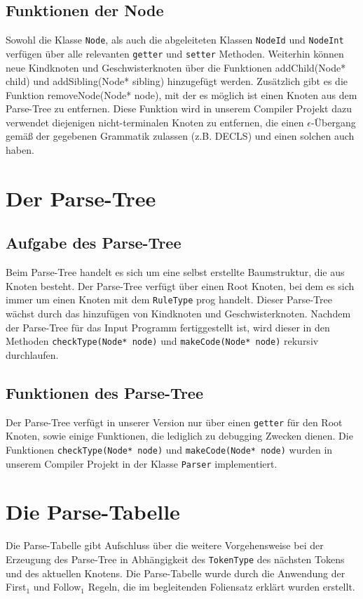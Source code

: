 \documentclass[
a4paper,   %
11pt,      %
oneside,   %
onecolumn, %
final      %
]{article}
\newcommand{\code}[1]{\lstinline$#1$}
\begin{document}
\subsection{Funktionen der Node}
Sowohl die Klasse \code{Node}, als auch die abgeleiteten Klassen \code{NodeId} und \code{NodeInt} verfügen über alle relevanten \code{getter} und \code{setter} Methoden. Weiterhin können neue Kindknoten und Geschwisterknoten über die Funktionen addChild(Node* child) und addSibling(Node* sibling) hinzugefügt werden. Zusätzlich gibt es die Funktion removeNode(Node* node), mit der es möglich ist einen Knoten aus dem Parse-Tree zu entfernen. Diese Funktion wird in unserem Compiler Projekt dazu verwendet diejenigen nicht-terminalen Knoten zu entfernen, die einen $\epsilon$-Übergang gemäß der gegebenen Grammatik zulassen (z.B. DECLS) und einen solchen auch haben.

\section{Der Parse-Tree} \label{sec:parsetree}
\subsection{Aufgabe des Parse-Tree}
Beim Parse-Tree handelt es sich um eine selbst erstellte Baumstruktur, die aus Knoten besteht. Der Parse-Tree verfügt über einen Root Knoten, bei dem es sich immer um einen Knoten mit dem \code{RuleType} prog handelt. Dieser Parse-Tree wächst durch das hinzufügen von Kindknoten und Geschwisterknoten. Nachdem der Parse-Tree für das Input Programm fertiggestellt ist, wird dieser in den Methoden \code{checkType(Node* node)} und \code{makeCode(Node* node)} rekursiv durchlaufen.

\subsection{Funktionen des Parse-Tree}
Der Parse-Tree verfügt in unserer Version nur über einen \code{getter} für den Root Knoten, sowie einige Funktionen, die lediglich zu debugging Zwecken dienen. Die Funktionen \code{checkType(Node* node)} und \code{makeCode(Node* node)} wurden in unserem Compiler Projekt in der Klasse \code{Parser} implementiert.

\section{Die Parse-Tabelle} \label{sec:parsetable}
Die Parse-Tabelle gibt Aufschluss über die weitere Vorgehensweise bei der Erzeugung des Parse-Tree in Abhängigkeit des \code{TokenType} des nächsten Tokens und des aktuellen Knotens. Die Parse-Tabelle wurde durch die Anwendung der First$_1$ und Follow$_1$ Regeln, die im begleitenden Foliensatz erklärt wurden erstellt.
\end{document}
